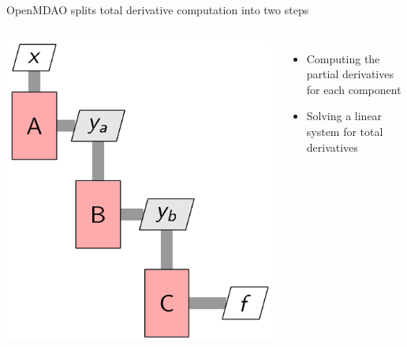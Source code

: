 \documentclass[aspectratio=169, usenames,dvipsnames, 14pt]{beamer}
\begin{document}
\begin{frame}{OpenMDAO splits total derivative computation into two steps}
\begin{columns}
        \includegraphics[scale=0.2]{images/slide76.png}
        
        \begin{itemize}
            \item Computing the partial derivatives for each component 
            \item Solving a linear system for total derivatives
        \end{itemize}
\end{columns}
    
\end{frame}
    
\end{document}
